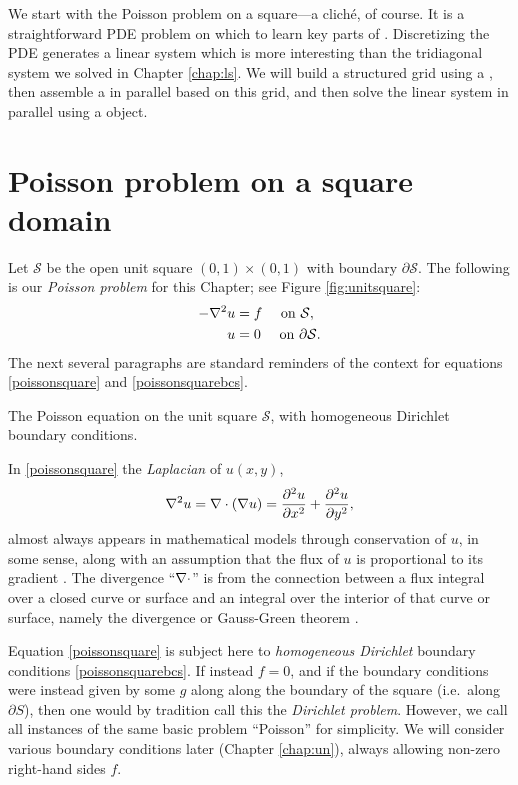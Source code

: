 
We start with the Poisson problem on a square---a clich\'e, of course.  It is a straightforward PDE problem on which to learn key parts of \PETSc.  Discretizing the PDE generates a linear system which is more interesting than the tridiagonal system we solved in Chapter \ref{chap:ls}.   We will build a structured grid using a \pDMDA, then assemble a \pMat in parallel based on this grid, and then solve the linear system in parallel using a \pKSP object.

\section{Poisson problem on a square domain}

Let $\mathcal{S}$ be the open unit square $(0,1)\times(0,1)$ with boundary $\partial\mathcal{S}$.  The following is our \emph{Poisson problem} for this Chapter;  see Figure \ref{fig:unitsquare}:
\begin{align}
- \nabla^2 u &= f \quad \text{ on } \mathcal{S}, \label{poissonsquare} \\
u &= 0 \quad \text{ on } \partial \mathcal{S}. \label{poissonsquarebcs}
\end{align}
The next several paragraphs are standard reminders of the context for equations \eqref{poissonsquare} and \eqref{poissonsquarebcs}.

\begin{marginfigure}

\caption{The Poisson equation on the unit square $\mathcal{S}$, with homogeneous Dirichlet boundary conditions.}
\label{fig:unitsquare}
\end{marginfigure}

In \eqref{poissonsquare} the \emph{Laplacian} of $u(x,y)$,
\begin{equation}
  \nabla^2 u = \nabla\cdot(\nabla u) = \frac{\partial^2 u}{\partial x^2} + \frac{\partial^2 u}{\partial y^2},  \label{eq:st:lapdefn}
\end{equation}
almost always appears in mathematical models through conservation of $u$, in some sense, along with an assumption that the flux of $u$ is proportional to its gradient \citep{Ockendonetal2003}.  The divergence ``$\nabla\cdot$'' is from the connection between a flux integral over a closed curve or surface and an integral over the interior of that curve or surface, namely the divergence or Gauss-Green theorem \citep[Appendix C]{Evans2010}.

Equation \eqref{poissonsquare} is subject here to \emph{homogeneous Dirichlet} boundary conditions \eqref{poissonsquarebcs}.  If instead $f=0$, and if the boundary conditions were instead given by some $g$ along along the boundary of the square (i.e.~along $\partial S$), then one would by tradition call this the \emph{Dirichlet problem}.  However, we call all instances of the same basic problem ``Poisson'' for simplicity.  We will consider various boundary conditions later (Chapter \ref{chap:un}), always allowing non-zero right-hand sides $f$.

